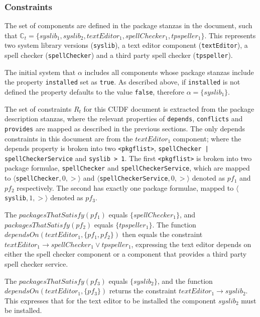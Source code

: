 \subsubsection{Constraints}

The set of components are defined in the package stanzas in the document,
such that $\mathbb{C}_t = \{syslib_1, syslib_2,  textEditor_1,  spellChecker_1,  tpspeller_1\}$.
This represents two system library versions (\verb+syslib+), a text editor component (\verb+textEditor+), a spell checker (\verb+spellChecker+) and a third party spell checker (\verb+tpspeller+).

The initial system that $\alpha$ includes all components whose package stanzas include the property \verb+installed+ set as \verb+true+.
As described above, if \verb+installed+ is not defined the property defaults to the value \verb+false+,
therefore $\alpha = \{ syslib_1 \}$.

The set of constraints $R_t$ for this CUDF document is extracted from the package description stanzas, where the relevant properties of \verb+depends+, \verb+conflicts+ and \verb+provides+ are
mapped as described in the previous sections. 
The only depends constraints in this document are from the $textEditor_1$ component;
where the depends property is broken into two \verb+<pkgflist>+, \verb+spellChecker | spellCheckerService+ and \verb+syslib > 1+.
The first \verb+<pkgflist>+ is broken into two package formulae, \verb+spellChecker+  and \verb+spellCheckerService+,
which are mapped to $\langle $\verb+spellChecker+$,0,>\rangle$ and $\langle $\verb+spellCheckerService+$,0,>\rangle$ denoted as $pf_1$ and $pf_2$ respectively.
The second has exactly one package formulae, mapped to $\langle $\verb+syslib+$,1,>\rangle$ denoted as $pf_3$.

The $packagesThatSatisfy(pf_1)$ equals $\{spellChecker_1\}$, and $packagesThatSatisfy(pf_2)$ equals $\{tpspeller_1\}$.
The function $dependsOn(textEditor_1 , \{pf_1,pf_2\} )$ 
then equals the constraint $textEditor_1 \rightarrow spellChecker_1 \vee tpspeller_1$,
expressing the text editor depends on either the spell checker component or a component that provides a third party spell checker service.

The $packagesThatSatisfy(pf_3)$ equals $\{syslib_2\}$,
and the function  $dependsOn(textEditor_1 , \{pf_3\} )$ returns the constraint  $textEditor_1 \rightarrow syslib_2$.
This expresses that for the text editor to be installed the component $syslib_2$ must be installed.


